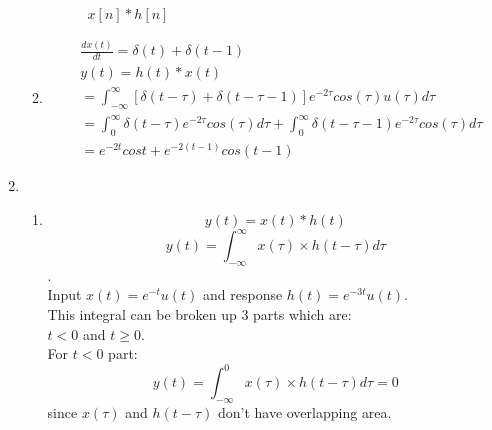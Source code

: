 \documentclass[10pt,a4paper, margin=1in]{article}
\begin{document}
\begin{enumerate}
\begin{enumerate}
    \begin{figure} [H]
    \centering
    \caption{$x[n]*h[n]$}
	\end{figure}

    \item %
    \begin{align*}
    &\frac{dx(t)}{dt} = \delta(t) + \delta(t-1) \\
    & y(t) = h(t)*x(t) \\
    &= \int_{-\infty}^{\infty}[\delta(t-\tau)+\delta(t-\tau-1)]e^{-2\tau}cos(\tau)u(\tau)d\tau \\
    &= \int_{0}^{\infty}\delta(t-\tau)e^{-2\tau}cos(\tau)d\tau + \int_{0}^{\infty}\delta(t-\tau-1)e^{-2\tau}cos(\tau)d\tau \\
    &= e^{-2t}cost + e^{-2(t-1)}cos(t-1)
    \end{align*}
    \end{enumerate}
\item      
    \begin{enumerate}
    \item %
    
    \[y(t)=x(t)*h(t)\]
    \[y(t) = \int_{-\infty}^{\infty} x(\tau) \times h(t-\tau) d\tau\].\\
    
    Input $x(t)=e^{-t}u(t)$ and response $h(t) = e^{-3t}u(t)$.\\
    This integral can be broken up 3 parts which are:\\
    $t<0$ and  $t\geq 0$.\\
    
    For $t<0$ part:
    \[y(t) = \int_{-\infty}^{0} x(\tau) \times h(t-\tau) d\tau = 0\] since $x(\tau)$ and $h(t-\tau)$ don't have overlapping area.\\
    

\end{enumerate}
\end{enumerate}
\end{document}
